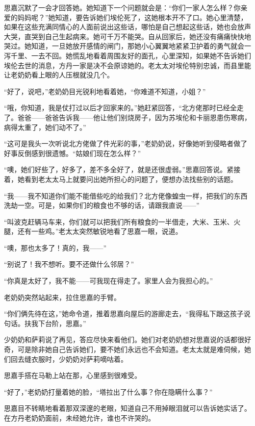 \par 思嘉沉默了一会才回答她。她知道下一个问题就会是：“你们一家人怎么样？你亲爱的妈妈呢？”她知道，要告诉她们埃伦死了，这她根本开不了口。她心里清楚，如果在这些充满同情心的人面前说出这些话，哪怕是自己想起这些话，她也会放声大哭，直哭到自己生起病来。她可千万不能哭。自从回家后，她还没有痛痛快快地哭过。她知道，一旦她放开感情的闸门，那她小心翼翼地紧紧卫护着的勇气就会一泻千里、一去不回。她慌乱地看着周围友好的面孔，心里深知，如果她不告诉她们埃伦去世的消息，方丹一家是决不会原谅她的。老太太对埃伦特别忠诚，而县里能让老奶奶看上眼的人压根就没几个。
\par “好了，说吧，”老奶奶目光锐利地看着她，“你难道不知道，小姐？”
\par “哦，你知道，我是仗打过以后才回家来的。”她赶紧回答，“北方佬那时已经全走了。爸爸——爸爸告诉我——他让他们别烧房子，因为苏埃伦和卡丽恩患伤寒病，病得太重了，她们动不了。”
\par “这可是我头一次听说北方佬做了件光彩的事，”老奶奶说，好像她听到侵略者做了好事反倒感到很遗憾。“姑娘们现在怎么样？”
\par “噢，她们好些了，好多了，差不多全好了，就是还很虚弱。”思嘉回答说。紧接着，她看到老太太马上就要问出她所担心的问题了，便想办法找些别的话题。
\par “我——我不知道你们能不能借些吃的给我们？北方佬像蝗虫一样，把我们的东西洗劫一空。可是，如果你们的粮食也不够的话，请跟我直说——”
\par “叫波克赶辆马车来，你们就可以把我们所有粮食的一半借走，大米、玉米、火腿，还有一些鸡。”老太太突然敏锐地看了思嘉一眼，说道。
\par “噢，那也太多了！真的，我——”
\par “别说了！我不想听。要不还做什么邻居？”
\par “你真是太好了，我不能——可我现在得走了。家里人会为我担心的。”
\par 老奶奶突然站起来，拉住思嘉的手臂。
\par “你们俩先待在这，”她命令道，推着思嘉向屋后的游廊走去，“我得私下跟这孩子说句话。扶我下台阶，思嘉。”
\par 少奶奶和萨莉说了再见，答应尽快来看他们。她们对老奶奶想对思嘉说的话都很好奇，可是除非她自己告诉她们，要不她们永远也不会知道。老太太就是难伺候，她们回去缝衣服时，少奶奶对萨莉嘀咕着。
\par 思嘉手搭在马勒上站在那，心里感到很难受。
\par “好了，”老奶奶打量着她的脸，“塔拉出了什么事？你在隐瞒什么事？”
\par 思嘉目不转睛地看着那双深邃的老眼，知道自己不用掉眼泪就可以告诉她实话了。在方丹老奶奶面前，未经她允许，谁也不许哭的。
